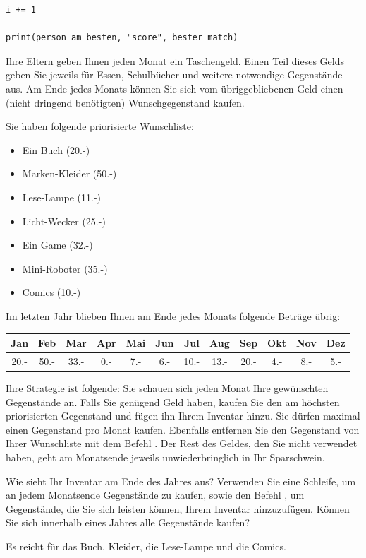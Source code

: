 \begin{questions}
\begin{parts}
\begin{solution}
\begin{lstlisting}[style=TigerJython]
    i += 1

print(person_am_besten, "score", bester_match)
\end{lstlisting}
	\end{solution}
\end{parts}
\droptotalpoints

\clearpage
{}

Ihre Eltern geben Ihnen jeden Monat ein Taschengeld. Einen Teil dieses Gelds geben Sie jeweils für Essen, Schulbücher und weitere notwendige Gegenstände aus. Am Ende jedes Monats können Sie sich vom übriggebliebenen Geld einen (nicht dringend benötigten) Wunschgegenstand kaufen.

Sie haben folgende priorisierte Wunschliste: 
\begin{itemize}
	\item Ein Buch (20.-)
	\item Marken-Kleider (50.-)
	\item Lese-Lampe (11.-)
	\item Licht-Wecker (25.-)
	\item Ein Game (32.-)
	\item Mini-Roboter (35.-)
	\item Comics (10.-)
\end{itemize}

Im letzten Jahr blieben Ihnen am Ende jedes Monats folgende Beträge übrig: 
\begin{table}[H]
	\centering
	\begin{tabular}{c|c|c|c|c|c|c|c|c|c|c|c}
	Jan & Feb & Mar & Apr & Mai & Jun & Jul & Aug & Sep & Okt & Nov & Dez \\\hline
	20.- & 50.- & 33.- & 0.- & 7.- & 6.- & 10.- & 13.- & 20.- & 4.- & 8.- & 5.-
	\end{tabular}
\end{table}

Ihre Strategie ist folgende: Sie schauen sich jeden Monat Ihre gewünschten Gegenstände an. Falls Sie genügend Geld haben, kaufen Sie den am höchsten priorisierten Gegenstand und fügen ihn Ihrem Inventar hinzu. Sie dürfen maximal einen Gegenstand pro Monat kaufen. Ebenfalls entfernen Sie den Gegenstand von Ihrer Wunschliste mit dem Befehl . Der Rest des Geldes, den Sie nicht verwendet haben, geht am Monatsende jeweils unwiederbringlich in Ihr Sparschwein.

Wie sieht Ihr Inventar am Ende des Jahres aus? Verwenden Sie eine Schleife, um an jedem Monatsende Gegenstände zu kaufen, sowie den Befehl , um Gegenstände, die Sie sich leisten können, Ihrem Inventar hinzuzufügen. Können Sie sich innerhalb eines Jahres alle Gegenstände kaufen?
	\begin{solution}
		Es reicht für das Buch, Kleider, die Lese-Lampe und die Comics.
		

\end{solution}
\end{questions}
